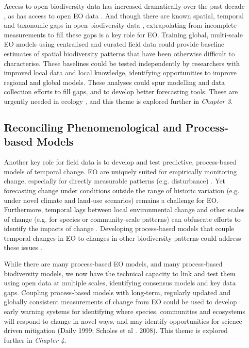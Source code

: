 Access to open biodiversity data has increased dramatically over the past decade \cite{Kattge2011-tf, Jetz2012-mw, Metzger2013-mz, Culina2018-ih}, as has access to open EO data \cite{Nemani2011-ls, Irons2012-fm, Gorelick2017-nx}. And though there are known spatial, temporal and taxonomic gaps in open biodiversity data \cite{Beck2014-am, Geijzendorffer2016-xv}, extrapolating from incomplete measurements to fill these gaps is a key role for EO. Training global, multi‐scale EO models using centralised and curated field data could provide baseline estimates of spatial biodiversity patterns that have been otherwise difficult to characterise. These baselines could be tested independently by researchers with improved local data and local knowledge, identifying opportunities to improve regional and global models. These analyses could spur modelling and data collection efforts to fill gaps, and to develop better forecasting tools. These are urgently needed in ecology \cite{Dietze2018-eh}, and this theme is explored further in \textit{Chapter 3}.

\subsection{Reconciling Phenomenological and Process-based Models}

Another key role for field data is to develop and test predictive, process‐based models of temporal change. EO are uniquely suited for empirically monitoring change, especially for directly measurable patterns (e.g. disturbance) \cite{zhu2012continuous, cohen2016forest}. Yet forecasting change under conditions outside the range of historic variation (e.g. under novel climate and land‐use scenarios) remains a challenge for EO. Furthermore, temporal lags between local environmental change and other scales of change (e.g. for species or community‐scale patterns) can obfuscate efforts to identify the impacts of change \cite{essl2015delayed}. Developing process‐based models that couple temporal changes in EO to changes in other biodiversity patterns could address these issues \cite{korzukhin1996process,adams2013empirical}. 

While there are many process‐based EO models, and many process‐based biodiversity models, we now have the technical capacity to link and test them using open data at multiple scales, identifying consensus models and key data gaps. Coupling process‐based models with long‐term, regularly updated and globally consistent measurements of change from EO could be used to develop early warning systems for identifying where species, communities and ecosystems will respond to change in novel ways, and may identify opportunities for science‐driven mitigation (Daily 1999; Scholes et al . 2008). This theme is explored further in \textit{Chapter 4}.

